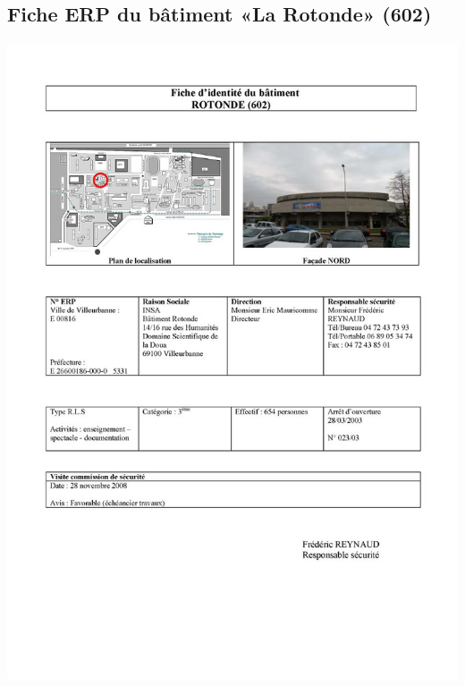 \documentclass[hidelinks, paper=a4, fontsize=13pt]{report}
\begin{document}
\subsection{Fiche ERP du bâtiment «La Rotonde» (602)}
\begin{center}
\includegraphics[scale=0.5]{Annexes/Documents/ERPRotonde}
\end{center}
\end{document}
